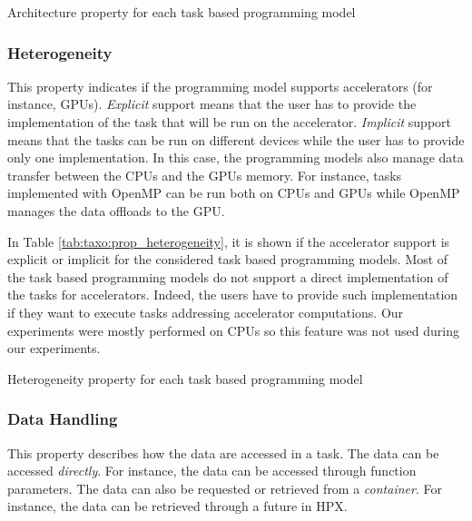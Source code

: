 \begin{table}[H]
	\caption{Architecture property for each task based programming model \label{tab:taxo:prop_architecture}}
	\centering
	\begin{multicols}{2}
		

		
	\end{multicols}
\end{table}

\subsubsection{Heterogeneity}
This property indicates if the programming model supports accelerators (for instance, GPUs).
\textit{Explicit} support means that the user has to provide the implementation of the task that will be run on the accelerator.
\textit{Implicit} support means that the tasks can be run on different devices while the user has to provide only one implementation.
In this case, the programming models also manage data transfer between the CPUs and the GPUs memory.
For instance, tasks implemented with OpenMP can be run both on CPUs and GPUs while OpenMP manages the data offloads to the GPU.

In Table \ref{tab:taxo:prop_heterogeneity}, it is shown if the accelerator support is explicit or implicit for the considered task based programming models.
Most of the task based programming models do not support a direct implementation of the tasks for accelerators.
Indeed, the users have to provide such implementation if they want to execute tasks addressing accelerator computations.
Our experiments were mostly performed on CPUs so this feature was not used during our experiments.

\begin{table}[H]
	\caption{Heterogeneity property for each task based programming model \label{tab:taxo:prop_heterogeneity}}
	\centering
	\begin{multicols}{2}
		

		
	\end{multicols}
\end{table}

\subsubsection{Data Handling}
This property describes how the data are accessed in a task.
The data can be accessed \textit{directly}.
For instance, the data can be accessed through function parameters.
The data can also be requested or retrieved from a \textit{container}.
For instance, the data can be retrieved through a future in HPX.

